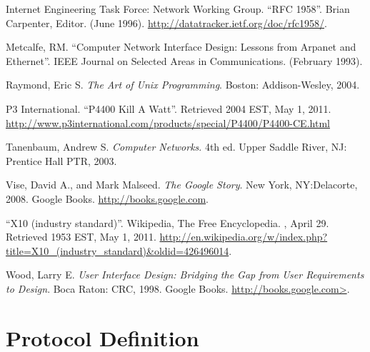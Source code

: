 \documentclass[11pt]{article}
\begin{document}
\renewcommand{\refname}{\section{References}}
\begin{thebibliography}{10}

 Internet Engineering Task Force: Network Working Group.
  \newblock ``RFC 1958''.
  \newblock Brian Carpenter, Editor.
  \newblock (June 1996).
  \newblock \url{http://datatracker.ietf.org/doc/rfc1958/}.

 Metcalfe, RM.
  \newblock ``Computer Network Interface Design: Lessons from
  Arpanet and Ethernet''.
  \newblock IEEE Journal on Selected Areas in Communications.
  \newblock (February 1993).

 Raymond, Eric S.
  \newblock \emph{The Art of Unix Programming}.
  \newblock Boston: Addison-Wesley, 2004.

 P3 International.
  \newblock ``P4400 Kill A Watt''.
  \newblock Retrieved 2004 EST, May 1, 2011.
  \newblock \url{http://www.p3international.com/products/special/P4400/P4400-CE.html}

 Tanenbaum, Andrew S.
  \newblock \emph{Computer Networks}. 4th ed.
  \newblock Upper Saddle River, NJ: Prentice Hall PTR, 2003.

 Vise, David A., and Mark Malseed.
  \newblock \emph{The Google Story}.
  \newblock New York, NY:Delacorte, 2008.
  \newblock Google Books.
  \newblock \url{http://books.google.com}.

 ``X10 (industry standard)''.
  \newblock Wikipedia, The Free Encyclopedia.
  , April 29.  Retrieved 1953 EST, May 1, 2011.
  \newblock \url{http://en.wikipedia.org/w/index.php?title=X10_(industry_standard)&oldid=426496014}.

 Wood, Larry E.
  \newblock \emph{User Interface Design: Bridging the Gap from User
    Requirements to Design}.
  \newblock Boca Raton: CRC, 1998.
  \newblock Google Books.
  \newblock \url{http://books.google.com>}.

\end{thebibliography}

\pagebreak

\appendix

\section{Protocol Definition}
\label{sec:ProtocolDefiniton}
\end{document}
